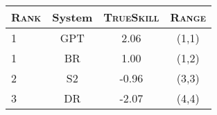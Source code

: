 \begin{tabular}{l|ccc} 
\hline
\textsc{Rank} & System & \textsc{TrueSkill} &   \textsc{Range}\\
\hline 
1 & \textsc{GPT} & 2.06  & (1,1)  \\
1 & \textsc{BR} & 1.00  & (1,2) \\
2 & \textsc{S2} & -0.96 & (3,3) \\
3 & \textsc{DR} & -2.07 & (4,4) \\
\end{tabular}